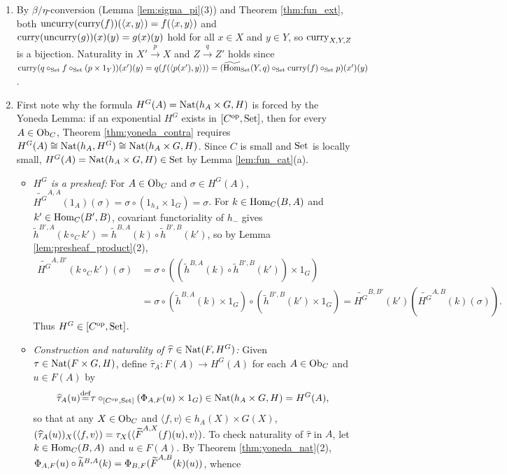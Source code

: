 \documentclass[10pt,a4paper]{article}
\begin{document}
\begin{enumerate}
\item By $\beta/\eta$-conversion (Lemma \ref{lem:sigma_pi}(3)) and Theorem \ref{thm:fun_ext}, both ${\mathrm{uncurry}}({\mathrm{curry}}(f))(\langle x,y \rangle) = f(\langle x,y \rangle)$ and ${\mathrm{curry}}({\mathrm{uncurry}}(g))(x)(y) = g(x)(y)$ hold for all $x \in X$ and $y \in Y$, so ${\mathrm{curry}}_{X,Y,Z}$ is a bijection. Naturality in $X' \xrightarrow{p} X$ and $Z \xrightarrow{q} Z'$ holds since ${\mathrm{curry}}(q \circ_{\textrm{Set}} f \circ_{\textrm{Set}} (p \times 1_Y))(x')(y) = q(f(\langle p(x'), y \rangle)) = ({\widetilde{{\textrm{Hom}}}\textrm{}}_{\textrm{Set}}(Y, q) \circ_{\textrm{Set}} {\mathrm{curry}}(f) \circ_{\textrm{Set}} p)(x')(y)$.
\item First note why the formula $H^G(A) = {\textrm{Nat}}(h_A \times G, H)$ is forced by the Yoneda Lemma: if an exponential $H^G$ exists in $[C^{\textrm{op}}, {\textrm{Set}}]$, then for every $A \in {\textrm{Ob}}_C$, Theorem \ref{thm:yoneda_contra} requires $H^G(A) \cong {\textrm{Nat}}(h_A, H^G) \cong {\textrm{Nat}}(h_A \times G, H)$. Since $C$ is small and ${\textrm{Set}}$ is locally small, $H^G(A) = {\textrm{Nat}}(h_A \times G, H) \in {\textrm{Set}}$ by Lemma \ref{lem:fun_cat}(a).
\begin{itemize}
\item \emph{$H^G$ is a presheaf:} For $A \in {\textrm{Ob}}_C$ and $\sigma \in H^G(A)$, $\widetilde{H^G}^{A,A}(1_A)(\sigma) = \sigma \circ (1_{h_A} \times 1_G) = \sigma$. For $k \in {\textrm{Hom}}_C(B, A)$ and $k' \in {\textrm{Hom}}_C(B', B)$, covariant functoriality of $h_-$ gives $\widetilde{h}^{B',A}(k \circ_C k') = \widetilde{h}^{B,A}(k) \circ \widetilde{h}^{B',B}(k')$, so by Lemma \ref{lem:presheaf_product}(2),
\begin{align*}
\widetilde{H^G}^{A,B'}(k \circ_C k')(\sigma) &= \sigma \circ \left((\widetilde{h}^{B,A}(k) \circ \widetilde{h}^{B',B}(k')) \times 1_G\right) \\
&= \sigma \circ (\widetilde{h}^{B,A}(k) \times 1_G) \circ (\widetilde{h}^{B',B}(k') \times 1_G) = \widetilde{H^G}^{B,B'}(k')\left(\widetilde{H^G}^{A,B}(k)(\sigma)\right).
\end{align*}
Thus $H^G \in [C^{\textrm{op}}, {\textrm{Set}}]$.
\item \emph{Construction and naturality of $\widehat{\tau} \in {\textrm{Nat}}(F, H^G)$:} Given $\tau \in {\textrm{Nat}}(F \times G, H)$, define $\widehat{\tau}_A : F(A) \to H^G(A)$ for each $A \in {\textrm{Ob}}_C$ and $u \in F(A)$ by
$$\widehat{\tau}_A(u) {\stackrel{{\textrm{def}}}{=}} \tau \circ_{[C^{\textrm{op}},{\textrm{Set}}]} \left(\Phi_{A,F}(u) \times 1_G\right) \in {\textrm{Nat}}(h_A \times G, H) = H^G(A),$$
so that at any $X \in {\textrm{Ob}}_C$ and $\langle f, v \rangle \in h_A(X) \times G(X)$, $(\widehat{\tau}_A(u))_X(\langle f, v \rangle) = \tau_X(\langle {\widetilde{F}\textrm{}}^{A,X}(f)(u), v \rangle)$. To check naturality of $\widehat{\tau}$ in $A$, let $k \in {\textrm{Hom}}_C(B, A)$ and $u \in F(A)$. By Theorem \ref{thm:yoneda_nat}(2), $\Phi_{A,F}(u) \circ \widetilde{h}^{B,A}(k) = \Phi_{B,F}({\widetilde{F}\textrm{}}^{A,B}(k)(u))$, whence

\end{itemize}
\end{enumerate}
\end{document}
